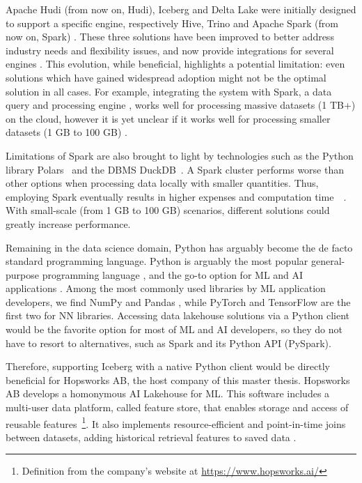 Apache Hudi (from now on, Hudi), Iceberg and Delta Lake were initially designed to support a specific engine, respectively Hive, Trino and Apache Spark (from now on, Spark) \cite{ApacheHudiVs}. These three solutions have been improved to better address industry needs and flexibility issues, and now provide integrations for several engines \cite{OngoingEvolutionTableFormat}. This evolution, while beneficial, highlights a potential limitation: even solutions which have gained widespread adoption might not be the optimal solution in all cases. For example, integrating the system with Spark, a data query and processing engine \cite{zahariaApacheSparkUnified2016}, works well for processing massive datasets (1 TB+) on the cloud, however it is yet unclear if it works well for processing smaller datasets (1 GB to 100 GB) \cite{Khazanchi1801362}. 

Limitations of Spark are also brought to light by technologies such as the Python library Polars~\cite{vinkWroteOneFastest2021} and the \gls{DBMS} DuckDB~\cite{raasveldtDuckDBEmbeddableAnalytical2019}. A Spark cluster performs worse than other options when processing data locally with smaller quantities. Thus, employing Spark eventually results in higher expenses and computation time~\cite{ebergenUpdatesH2OAi2023}~\cite{BenchmarkResultsSpark}. With small-scale (from 1 GB to 100 GB) scenarios, different solutions could greatly increase performance.

Remaining in the data science domain, Python has arguably become the de facto standard programming language. Python is arguably the most popular general-purpose programming language \cite{TIOBEIndex, StackOverflowDeveloper, PythonTopLanguage}, and the go-to option for \gls{ML} and \gls{AI} applications \cite{python-machine-learning}. Among the most commonly used libraries by \gls{ML} application developers, we find NumPy and Pandas \cite{StackOverflowDeveloper}, while PyTorch and TensorFlow are the first two for \gls{NN} libraries. Accessing data lakehouse solutions via a Python client would be the favorite option for most of \gls{ML} and \gls{AI} developers, so they do not have to resort to alternatives, such as Spark and its Python \gls{API} (PySpark). 

Therefore, supporting Iceberg with a native Python client would be directly beneficial for Hopsworks AB, the host company of this master thesis. Hopsworks AB develops a homonymous \gls{AI} Lakehouse for \gls{ML}. This software includes a multi-user data platform, called feature store, that enables storage and access of reusable features~\footnote{Definition from the company's website at \url{https://www.hopsworks.ai/}}. It also implements resource-efficient and point-in-time joins between datasets, adding historical retrieval features to saved data \cite{Pettersson1695672}.

